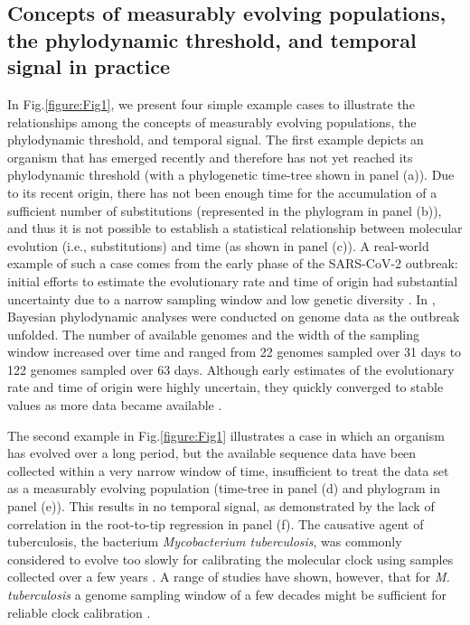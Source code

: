 \documentclass[11pt]{article}
\begin{document}
\subsection{Concepts of measurably evolving populations, the phylodynamic threshold, and temporal signal in practice}
In Fig.\ref{figure:Fig1}, we present four simple example cases to illustrate the relationships among the concepts of measurably evolving populations, the phylodynamic threshold, and temporal signal. The first example depicts an organism that has emerged recently and therefore has not yet reached its phylodynamic threshold (with a phylogenetic time-tree shown in panel (a)). Due to its recent origin, there has not been enough time for the accumulation of a sufficient number of substitutions (represented in the phylogram in panel (b)), and thus it is not possible to establish a statistical relationship between molecular evolution (i.e., substitutions) and time (as shown in panel (c)). A real-world example of such a case comes from the early phase of the SARS-CoV-2 outbreak: initial efforts to estimate the evolutionary rate and time of origin had substantial uncertainty due to a narrow sampling window and low genetic diversity \citep{boni2020evolutionary}. In \cite{duchene2020temporal}, Bayesian phylodynamic analyses were conducted on genome data as the outbreak unfolded. The number of available genomes and the width of the sampling window increased over time and ranged from 22 genomes sampled over 31 days to 122 genomes sampled over 63 days. Although early estimates of the evolutionary rate and time of origin were highly uncertain, they quickly converged to stable values as more data became available \citep{ghafari2022purifying}. 

The second example in Fig.\ref{figure:Fig1} illustrates a case in which an organism has evolved over a long period, but the available sequence data have been collected within a very narrow window of time, insufficient to treat the data set as a measurably evolving population (time-tree in panel (d) and phylogram in panel (e)). This results in no temporal signal, as demonstrated by the lack of correlation in the root-to-tip regression in panel (f). The causative agent of tuberculosis, the bacterium \textit{Mycobacterium tuberculosis}, was commonly considered to evolve too slowly for calibrating the molecular clock using samples collected over a few years \cite{duchene2016genome}. A range of studies have shown, however, that for \textit{M. tuberculosis} a genome sampling window of a few decades might be sufficient for reliable clock calibration \citep{eldholm2015four, menardo2019molecular, kuhnert2018tuberculosis, merker2022transcontinental}. 
 
\end{document}
